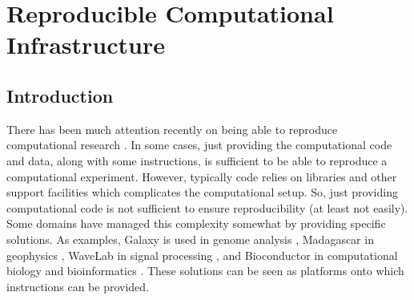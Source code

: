

%

\chapter{Reproducible Computational Infrastructure}


\section{Introduction}


There has been much attention recently on being able to reproduce computational research \cite{Stodden2013}. 
%
In some cases, just providing the computational code and data, along with some instructions, is sufficient to be able to reproduce a computational experiment.
%
However, typically code relies on libraries and other support facilities which complicates the computational setup.
%
So, just providing computational code is not sufficient to ensure reproducibility (at least not easily).
%
Some domains have managed this complexity somewhat by providing specific solutions.
%
As examples, \textsf{Galaxy} is used in genome analysis \cite{Giardine2005},
%
\textsf{Madagascar} in geophysics \cite{Fomel2013},
%
\textsf{WaveLab} in signal processing \cite{Buckheit1995},
%
and \textsf{Bioconductor} in computational biology and bioinformatics \cite{Gentleman2004}.
%
These solutions can be seen as platforms onto which instructions can be provided.



